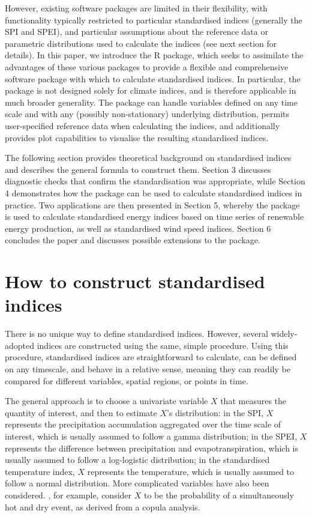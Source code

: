 However, existing software packages are limited in their flexibility, with functionality typically restricted to particular standardised indices (generally the SPI and SPEI), and particular assumptions about the reference data or parametric distributions used to calculate the indices (see next section for details). In this paper, we introduce the  R package, which seeks to assimilate the advantages of these various packages to provide a flexible and comprehensive software package with which to calculate standardised indices. In particular, the package is not designed solely for climate indices, and is therefore applicable in much broader generality. The package can handle variables defined on any time scale and with any (possibly non-stationary) underlying distribution, permits user-specified reference data when calculating the indices, and additionally provides plot capabilities to visualise the resulting standardised indices.

The following section provides theoretical background on standardised indices and describes the general formula to construct them. Section 3 discusses diagnostic checks that confirm the standardisation was appropriate, while Section 4 demonstrates how the  package can be used to calculate standardised indices in practice. Two applications are then presented in Section 5, whereby the  package is used to calculate standardised energy indices based on time series of renewable energy production, as well as standardised wind speed indices. Section 6 concludes the paper and discusses possible extensions to the package.

\hypertarget{how-to-construct-standardised-indices}{%
\section{How to construct standardised indices}\label{how-to-construct-standardised-indices}}

There is no unique way to define standardised indices. However, several widely-adopted indices are constructed using the same, simple procedure. Using this procedure, standardised indices are straightforward to calculate, can be defined on any timescale, and behave in a relative sense, meaning they can readily be compared for different variables, spatial regions, or points in time.

The general approach is to choose a univariate variable \(X\) that measures the quantity of interest, and then to estimate \(X\)'s distribution: in the SPI, \(X\) represents the precipitation accumulation aggregated over the time scale of interest, which is usually assumed to follow a gamma distribution; in the SPEI, \(X\) represents the difference between precipitation and evapotranspiration, which is usually assumed to follow a log-logistic distribution; in the standardised temperature index, \(X\) represents the temperature, which is usually assumed to follow a normal distribution. More complicated variables have also been considered. \cite{HaoEtAl2019}, for example, consider \(X\) to be the probability of a simultaneously hot and dry event, as derived from a copula analysis.

